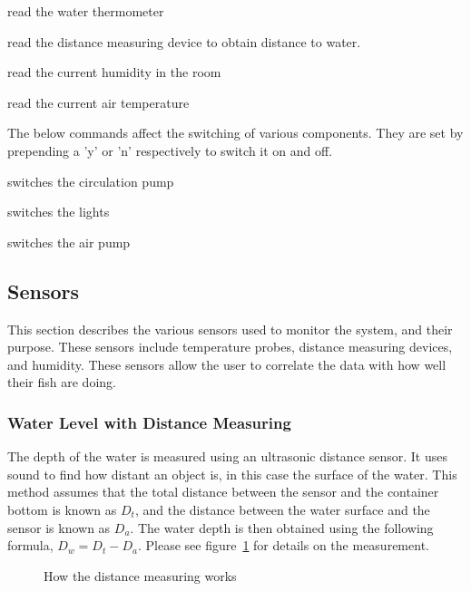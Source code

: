 \documentclass[american,12pt]{article}
\begin{document}
\begin{description}[style=nextline]
    \item[rWatThm] read the water thermometer
    \item[rdWaLvl] read the distance measuring device to obtain distance to water.
    \item[rdHumid] read the current humidity in the room
    \item[rdAirTm] read the current air temperature
\end{description}

The below commands affect the switching of various components. They are set by
prepending a 'y' or 'n' respectively to switch it on and off.

\begin{description}[style=nextline]
    \item[CiPump] switches the circulation pump
    \item[Lights] switches the lights
    \item[AirPmp] switches the air pump
\end{description}




\subsection{Sensors}
This section describes the various sensors used to monitor the system, and their
purpose. These sensors include temperature probes, distance measuring devices,
and humidity. These sensors allow the user to correlate the data with how well
their fish are doing.

\subsubsection{Water Level with Distance Measuring}
The depth of the water is measured using an ultrasonic distance sensor. It uses
sound to find how distant an object is, in this case the surface of the water.
This method assumes that the total distance between the sensor and the container
bottom is known as $D_t$, and the distance between the water surface and the sensor
is known as $D_a$. The water depth is then obtained using the following formula,
$D_w = D_t - D_a$. Please see figure~\ref{fig:distance measuring} for details on the
measurement.

\begin{figure}[h]
    \centering
    \caption{How the distance measuring works}
    \label{fig:distance measuring}
\end{figure}
\end{document}
